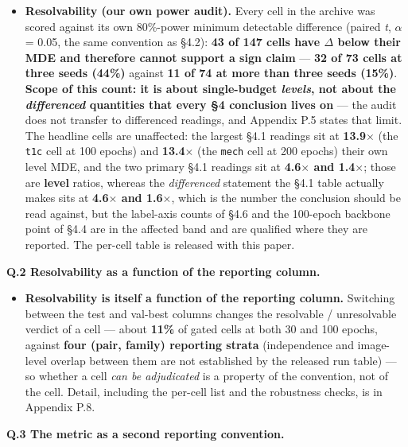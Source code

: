 \documentclass[pdflatex,sn-mathphys-ay]{sn-jnl}
\begin{document}
\begin{itemize}
\item \textbf{Resolvability (our own power audit).} Every cell in the archive was scored against its own 80\%-power minimum detectable difference (paired \emph{t}, \ensuremath{\alpha} = 0.05, the same convention as \S{}4.2): \textbf{43 of 147 cells have \textbar{}\ensuremath{\Delta}\textbar{} below their MDE and therefore cannot support a sign claim} --- \textbf{32 of 73 cells at three seeds (44\%)} against \textbf{11 of 74 at more than three seeds (15\%)}. \textbf{Scope of this count: it is about single-budget \emph{levels}, not about the \emph{differenced} quantities that every \S{}4 conclusion lives on} --- the audit does not transfer to differenced readings, and Appendix P.5 states that limit. The headline cells are unaffected: the largest \S{}4.1 readings sit at \textbf{13.9\ensuremath{\times}} (the \texttt{t1c} cell at 100 epochs) and \textbf{13.4\ensuremath{\times}} (the \texttt{mech} cell at 200 epochs) their own level MDE, and the two primary \S{}4.1 readings sit at \textbf{4.6\ensuremath{\times} and 1.4\ensuremath{\times}}; those are \textbf{level} ratios, whereas the \emph{differenced} statement the \S{}4.1 table actually makes sits at \textbf{4.6\ensuremath{\times} and 1.6\ensuremath{\times}}, which is the number the conclusion should be read against, but the label-axis counts of \S{}4.6 and the 100-epoch backbone point of \S{}4.4 are in the affected band and are qualified where they are reported. The per-cell table is released with this paper.
\end{itemize}

\textbf{Q.2 Resolvability as a function of the reporting column.}

\begin{itemize}
\item \textbf{Resolvability is itself a function of the reporting column.} Switching between the test and val-best columns changes the resolvable / unresolvable verdict of a cell --- about \textbf{11\%} of gated cells at both 30 and 100 epochs, against \textbf{four (pair, family) reporting strata} (independence and image-level overlap between them are not established by the released run table) --- so whether a cell \emph{can be adjudicated} is a property of the convention, not of the cell. Detail, including the per-cell list and the robustness checks, is in Appendix P.8.
\end{itemize}

\textbf{Q.3 The metric as a second reporting convention.}
\end{document}
